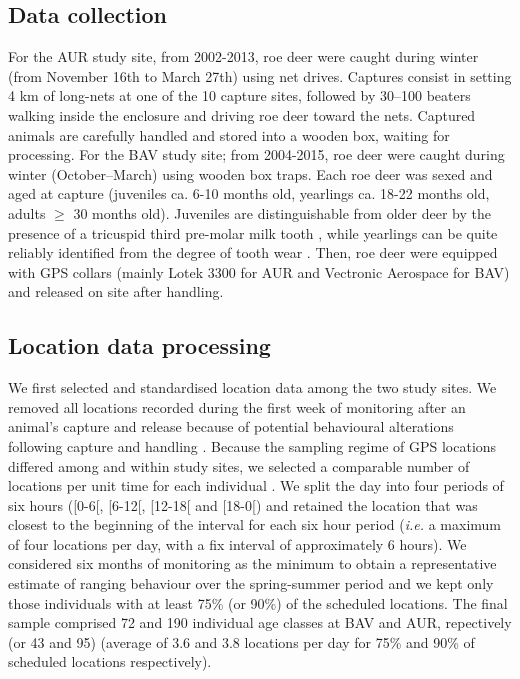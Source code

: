 \documentclass[a4paper,11pt]{article}
\begin{document}
\subsection*{Data collection}
For the AUR study site, from 2002-2013, roe deer were caught during
winter (from November 16th to March 27th) using net drives. Captures
consist in setting 4 km of long-nets at one of the 10 capture sites,
followed by 30--100 beaters walking inside the enclosure and driving
roe deer toward the nets. Captured animals are carefully handled and
stored into a wooden box, waiting for processing. For the BAV study
site; from 2004-2015, roe deer were caught during winter
(October–March) using wooden box traps. Each roe deer was sexed and aged at
capture (juveniles ca. 6-10 months old, yearlings ca. 18-22 months
old, adults $\geq$ 30 months old). Juveniles are distinguishable from
older deer by the presence of a tricuspid third pre-molar milk tooth
\citep{ratcliffe_roe_1992}, while yearlings can be quite reliably
identified from the degree of tooth wear
\citep{hewison_tests_1999}. Then, roe deer were equipped with GPS
collars (mainly Lotek 3300 for AUR and Vectronic Aerospace for BAV)
and released on site after handling.

\subsection*{Location data processing}
We first selected and standardised location data among the two study
sites. We removed all locations recorded during the first week of
monitoring after an animal’s capture and release because of potential
behavioural alterations following capture and handling
\citep{morellet_effect_2009}. Because the sampling regime of GPS
locations differed among and within study sites, we selected a
comparable number of locations per unit time for each individual
\citep{morellet_seasonality_2013}. We split the day into four periods
of six hours ([0-6[, [6-12[, [12-18[ and [18-0[) and retained the
location that was closest to the beginning of the interval for each
six hour period (\textit{i.e.} a maximum of four locations per day,
with a fix interval of approximately 6 hours). We considered six
months of monitoring as the minimum to obtain a representative
estimate of ranging behaviour over the spring-summer period and we
kept only those individuals with at least 75\% (or 90\%) of the
scheduled locations. The final sample comprised 72 and 190 individual
age classes at BAV and AUR, repectively (or 43 and 95) (average of 3.6
and 3.8 locations per day for 75\% and 90\% of scheduled locations
respectively).
\end{document}
